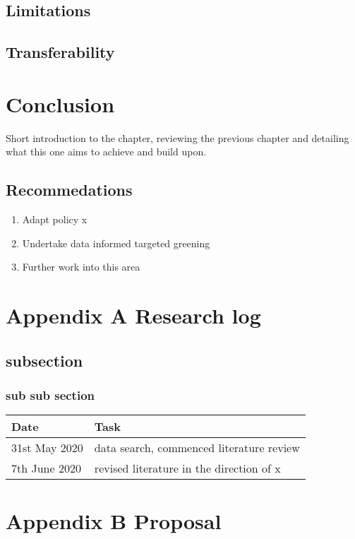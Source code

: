 \documentclass[
  12pt,
  oneside]{book}
\providecommand{\tightlist}{%
  \setlength{\itemsep}{0pt}\setlength{\parskip}{0pt}}
\begin{document}
\section{Limitations}\label{limitations}

\section{Transferability}\label{transferability}

\chapter{Conclusion}\label{conclusion}

Short introduction to the chapter, reviewing the previous chapter and detailing what this one aims to achieve and build upon.

\section{Recommedations}\label{recommedations}

\begin{enumerate}
\def\labelenumi{\arabic{enumi}.}
\tightlist
\item
  Adapt policy x
\item
  Undertake data informed targeted greening
\item
  Further work into this area
\end{enumerate}

\printbibliography

\chapter*{Appendix A Research log}\label{appendix-a-research-log}


\section*{subsection}\label{subsection}

\subsection*{sub sub section}\label{sub-sub-section}

\begin{table}
\centering
\begin{tabular}{ll}
\toprule
\textbf{Date} & \textbf{Task}\\
\midrule
31st May 2020 & data search, commenced literature review\\
7th June 2020 & revised literature in the direction of x\\
\bottomrule
\end{tabular}
\end{table}

\chapter*{Appendix B Proposal}\label{appendix-b-proposal}

\enddocument

\printbibliography
\end{document}
